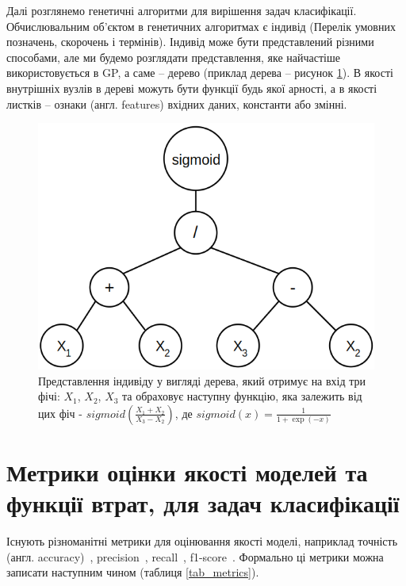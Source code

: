 Далі розглянемо генетичні алгоритми для вирішення задач класифікації. Обчислювальним об'єктом в генетичних алгоритмах є індивід (Перелік умовних позначень, скорочень і термінів). Індивід може бути представлений різними способами, але ми будемо розглядати представлення, яке найчастіше використовується в GP, а саме -- дерево (приклад дерева -- рисунок \ref{fig_genotype}). В якості внутрішніх вузлів в дереві можуть бути функції будь якої арності, а в якості листків -- ознаки (англ. features) вхідних даних, константи або змінні. 

\begin{figure}[ht]
	\centering
	\includegraphics[scale=0.5]{Images/genotype_example.png}
	\caption{Представлення індивіду у вигляді дерева, який отримує на вхід три фічі: $X_1$, $X_2$, $X_3$ та обраховує наступну функцію, яка залежить від цих фіч - $sigmoid\left(\frac{X_1 + X_2}{X_3 - X_2}\right)$, де $sigmoid(x) = \frac{1}{1 + \exp(-x)}$}
	\label{fig_genotype}
\end{figure}

\section{Метрики оцінки якості моделей та функції втрат, для задач класифікації}\label{sec:metrics}


Існують різноманітні метрики для оцінювання якості моделі, наприклад точність (англ. accuracy)~\cite{ct6}, precision~\cite{ct6}, recall~\cite{ct7}, f1-score~\cite{ct8}. Формально ці метрики можна записати наступним чином (таблиця \ref{tab_metrics}).

